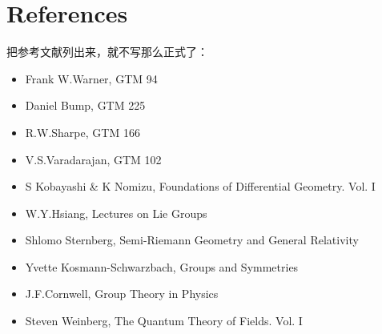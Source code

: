 \chapter*{References}
把参考文献列出来，就不写那么正式了：
\begin{itemize}

\item Frank W.Warner, GTM 94

\item Daniel Bump, GTM 225

\item R.W.Sharpe, GTM 166

\item V.S.Varadarajan, GTM 102

\item S Kobayashi \& K Nomizu, Foundations of Differential Geometry. Vol. I

\item W.Y.Hsiang, Lectures on Lie Groups

\item Shlomo Sternberg, Semi-Riemann Geometry and General Relativity

\item Yvette Kosmann-Schwarzbach, Groups and Symmetries

\item J.F.Cornwell, Group Theory in Physics

\item Steven Weinberg, The Quantum Theory of Fields. Vol. I

\end{itemize}
